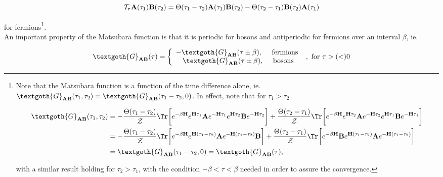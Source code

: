 $$
    {\mathcal {T}}_{\tau} {\bf A}(\tau_1) {\bf B}(\tau_2) = \Theta(\tau_1 - \tau_2) {\bf A}(\tau_1) {\bf B}(\tau_2) - \Theta(\tau_2 - \tau_1) {\bf B}(\tau_2) {\bf A}(\tau_1) 
$$

for fermions\footnote{Note that the Matsubara function is a function of the time difference alone, ie. $\textgoth{G}_{{\bf A} {\bf B}}(\tau_1, \tau_2) = \textgoth{G}_{{\bf A} {\bf B}}(\tau_1-\tau_2,0)$. In effect, note that for $\tau_1 > \tau_2$

\begin{equation*}
    \begin{split}
        \textgoth{G}_{{\bf A} {\bf B}}(\tau_1, \tau_2) &= - \frac{\Theta(\tau_1-\tau_2)}{\mathcal{Z}} \Tr \bigg[
           e^{-\beta {\bf H}} e^{{\bf H} \tau_1} {\bf A} e^{-{\bf H}\tau_1} e^{{\bf H}\tau_2} {\bf B} e^{-{\bf H}\tau_2} 
        \bigg] + \frac{\Theta(\tau_2-\tau_1)}{\mathcal{Z}} \Tr \bigg[
           e^{-\beta {\bf H}} e^{{\bf H} \tau_2} {\bf A} e^{-{\bf H}\tau_2} e^{{\bf H}\tau_1} {\bf B} e^{-{\bf H}\tau_1} 
        \bigg] \\
        &= - \frac{\Theta(\tau_1-\tau_2)}{\mathcal{Z}} \Tr \bigg[
           e^{-\beta {\bf H}} e^{{\bf H} (\tau_1 - \tau_2)} {\bf A} e^{-{\bf H}(\tau_1-\tau_2)} {\bf B}  
        \bigg] + \frac{\Theta(\tau_2-\tau_1)}{\mathcal{Z}} \Tr \bigg[
           e^{-\beta {\bf H}}  {\bf B} e^{{\bf H} (\tau_1 - \tau_2)} {\bf A} e^{-{\bf H}(\tau_1 -\tau_2)}
        \bigg] \\
        &= \textgoth{G}_{{\bf A} {\bf B}}(\tau_1-\tau_2, 0) = \textgoth{G}_{{\bf A} {\bf B}}(\tau),
    \end{split}
\end{equation*}

with a similar result holding for $\tau_2 > \tau_1$, with the condition $-\beta < \tau < \beta$ needed in order to assure the convergence.
}. \\

An important property of the Matsubara function is that it is periodic for bosons and antiperiodic for fermions over an interval $\beta$, ie. 

\begin{equation}
    \textgoth{G}_{{\bf A} {\bf B}}(\tau) = 
    \left\{\begin{array}{cc}
         -\textgoth{G}_{{\bf A} {\bf B}}(\tau \pm \beta), \quad \textnormal{ fermions } \\
         \textgoth{G}_{{\bf A} {\bf B}}(\tau \pm \beta), \quad \textnormal{ bosons}
    \end{array} \right., \textnormal{ for $\tau >(<)0$}
\end{equation}

